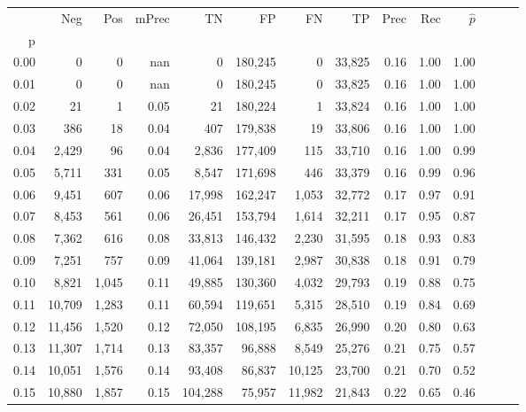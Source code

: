 \begin{tabular}{rrrrrrrrrrrrrr}
\toprule
{} &     Neg &    Pos & mPrec &       TN &       FP &      FN &      TP &  Prec &   Rec & $\hat{p}$ \\
p    &         &        &       &          &          &         &         &       &       &           \\
\midrule
0.00 &       0 &      0 &   nan &        0 &  180,245 &       0 &  33,825 &  0.16 &  1.00 &      1.00 \\
0.01 &       0 &      0 &   nan &        0 &  180,245 &       0 &  33,825 &  0.16 &  1.00 &      1.00 \\
0.02 &      21 &      1 &  0.05 &       21 &  180,224 &       1 &  33,824 &  0.16 &  1.00 &      1.00 \\
0.03 &     386 &     18 &  0.04 &      407 &  179,838 &      19 &  33,806 &  0.16 &  1.00 &      1.00 \\
0.04 &   2,429 &     96 &  0.04 &    2,836 &  177,409 &     115 &  33,710 &  0.16 &  1.00 &      0.99 \\
0.05 &   5,711 &    331 &  0.05 &    8,547 &  171,698 &     446 &  33,379 &  0.16 &  0.99 &      0.96 \\
0.06 &   9,451 &    607 &  0.06 &   17,998 &  162,247 &   1,053 &  32,772 &  0.17 &  0.97 &      0.91 \\
0.07 &   8,453 &    561 &  0.06 &   26,451 &  153,794 &   1,614 &  32,211 &  0.17 &  0.95 &      0.87 \\
0.08 &   7,362 &    616 &  0.08 &   33,813 &  146,432 &   2,230 &  31,595 &  0.18 &  0.93 &      0.83 \\
0.09 &   7,251 &    757 &  0.09 &   41,064 &  139,181 &   2,987 &  30,838 &  0.18 &  0.91 &      0.79 \\
0.10 &   8,821 &  1,045 &  0.11 &   49,885 &  130,360 &   4,032 &  29,793 &  0.19 &  0.88 &      0.75 \\
0.11 &  10,709 &  1,283 &  0.11 &   60,594 &  119,651 &   5,315 &  28,510 &  0.19 &  0.84 &      0.69 \\
0.12 &  11,456 &  1,520 &  0.12 &   72,050 &  108,195 &   6,835 &  26,990 &  0.20 &  0.80 &      0.63 \\
0.13 &  11,307 &  1,714 &  0.13 &   83,357 &   96,888 &   8,549 &  25,276 &  0.21 &  0.75 &      0.57 \\
0.14 &  10,051 &  1,576 &  0.14 &   93,408 &   86,837 &  10,125 &  23,700 &  0.21 &  0.70 &      0.52 \\
0.15 &  10,880 &  1,857 &  0.15 &  104,288 &   75,957 &  11,982 &  21,843 &  0.22 &  0.65 &      0.46 \\

\end{tabular}
